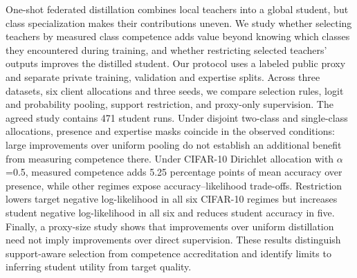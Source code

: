 One-shot federated distillation combines local teachers into a global student, but class specialization makes their contributions uneven. We study whether selecting teachers by measured class competence adds value beyond knowing which classes they encountered during training, and whether restricting selected teachers' outputs improves the distilled student. Our protocol uses a labeled public proxy and separate private training, validation and expertise splits. Across three datasets, six client allocations and three seeds, we compare selection rules, logit and probability pooling, support restriction, and proxy-only supervision. The agreed study contains 471 student runs. Under disjoint two-class and single-class allocations, presence and expertise masks coincide in the observed conditions: large improvements over uniform pooling do not establish an additional benefit from measuring competence there. Under CIFAR-10 Dirichlet allocation with \(\alpha\)=0.5, measured competence adds 5.25 percentage points of mean accuracy over presence, while other regimes expose accuracy--likelihood trade-offs. Restriction lowers target negative log-likelihood in all six CIFAR-10 regimes but increases student negative log-likelihood in all six and reduces student accuracy in five. Finally, a proxy-size study shows that improvements over uniform distillation need not imply improvements over direct supervision. These results distinguish support-aware selection from competence accreditation and identify limits to inferring student utility from target quality.

